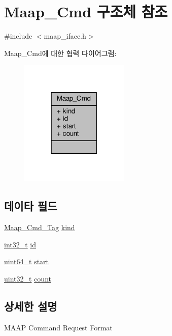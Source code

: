 \hypertarget{struct_maap___cmd}{}\section{Maap\+\_\+\+Cmd 구조체 참조}
\label{struct_maap___cmd}


{\ttfamily \#include $<$maap\+\_\+iface.\+h$>$}



Maap\+\_\+\+Cmd에 대한 협력 다이어그램\+:
\nopagebreak
\begin{figure}[H]
\begin{center}
\leavevmode
\includegraphics[width=147pt]{struct_maap___cmd__coll__graph}
\end{center}
\end{figure}
\subsection*{데이타 필드}
\begin{DoxyCompactItemize}
\item 
\hyperlink{maap__iface_8h_aaf90b1858e10440f7628ac5030e09a5c}{Maap\+\_\+\+Cmd\+\_\+\+Tag} \hyperlink{struct_maap___cmd_adf329e36449de220d4316603214476d4}{kind}
\item 
\hyperlink{parse_8c_a37994e3b11c72957c6f454c6ec96d43d}{int32\+\_\+t} \hyperlink{struct_maap___cmd_a2708c0bbb6f926149707c2c61fe43c3e}{id}
\item 
\hyperlink{parse_8c_aec6fcb673ff035718c238c8c9d544c47}{uint64\+\_\+t} \hyperlink{struct_maap___cmd_a6a51e9baeec9b06ae477cf6475efc71d}{start}
\item 
\hyperlink{parse_8c_a6eb1e68cc391dd753bc8ce896dbb8315}{uint32\+\_\+t} \hyperlink{struct_maap___cmd_a86988a65e0d3ece7990c032c159786d6}{count}
\end{DoxyCompactItemize}


\subsection{상세한 설명}
M\+A\+AP Command Request Format

